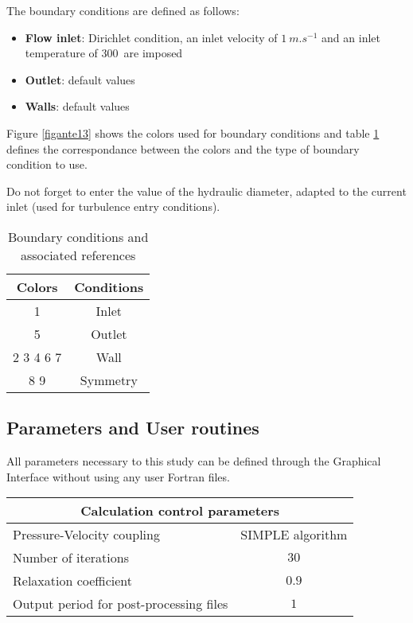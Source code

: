 The boundary conditions are defined as follows:
\begin{itemize}
        \item {\bfseries Flow inlet}: Dirichlet condition, an inlet velocity of
$1\ m.s^{-1}$ and an inlet temperature of 300\degresC\ are imposed
        \item {\bfseries Outlet}: default values
        \item {\bfseries Walls}: default values
\end{itemize}

Figure \ref{figante13} shows the colors used for boundary conditions and
table \ref{tabante11} defines the correspondance between the colors and
the type of boundary condition to use.

Do not forget to enter the value of the hydraulic diameter, adapted to the
current inlet (used for turbulence entry conditions).\\

\begin{table}[htp]
\begin{center}
\begin{tabular}{|c|c|}
\hline
Colors & Conditions \\
\hline
1 & Inlet \\
\hline
5 & Outlet \\
\hline
2 3 4 6 7 & Wall \\
\hline
8 9 & Symmetry\\
\hline
\end{tabular}
\caption{\label{tabante11}Boundary conditions and associated references}
\end{center}
\end{table}

        \subsection{Parameters and User routines}

All parameters necessary to this study can be defined through the Graphical
Interface without using any user Fortran files.

\begin{center}
\begin{tabular}{|l|c|}
\hline
\multicolumn{2}{|c|}{Calculation control parameters} \\
\hline
Pressure-Velocity coupling & SIMPLE algorithm \\
\hline
Number of iterations & $30$ \\
\hline
Relaxation coefficient & $0.9$ \\
\hline
Output period for post-processing files& $1$ \\
\hline
\end{tabular}
\end{center}



